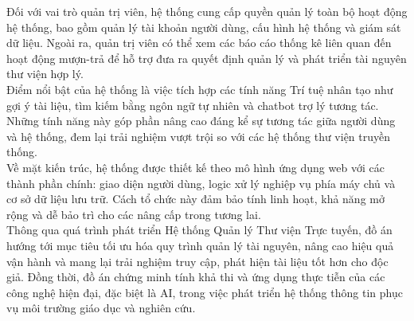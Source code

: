 Đối với vai trò quản trị viên, hệ thống cung cấp quyền quản lý toàn bộ hoạt động hệ thống, bao gồm quản lý tài khoản người dùng, cấu hình hệ thống và giám sát dữ liệu. Ngoài ra, quản trị viên có thể xem các báo cáo thống kê liên quan đến hoạt động mượn-trả để hỗ trợ đưa ra quyết định quản lý và phát triển tài nguyên thư viện hợp lý.\\

Điểm nổi bật của hệ thống là việc tích hợp các tính năng Trí tuệ nhân tạo như gợi ý tài liệu, tìm kiếm bằng ngôn ngữ tự nhiên và chatbot trợ lý tương tác. Những tính năng này góp phần nâng cao đáng kể sự tương tác giữa người dùng và hệ thống, đem lại trải nghiệm vượt trội so với các hệ thống thư viện truyền thống.\\

Về mặt kiến trúc, hệ thống được thiết kế theo mô hình ứng dụng web với các thành phần chính: giao diện người dùng, logic xử lý nghiệp vụ phía máy chủ và cơ sở dữ liệu lưu trữ. Cách tổ chức này đảm bảo tính linh hoạt, khả năng mở rộng và dễ bảo trì cho các nâng cấp trong tương lai.\\

Thông qua quá trình phát triển Hệ thống Quản lý Thư viện Trực tuyến, đồ án hướng tới mục tiêu tối ưu hóa quy trình quản lý tài nguyên, nâng cao hiệu quả vận hành và mang lại trải nghiệm truy cập, phát hiện tài liệu tốt hơn cho độc giả. Đồng thời, đồ án chứng minh tính khả thi và ứng dụng thực tiễn của các công nghệ hiện đại, đặc biệt là AI, trong việc phát triển hệ thống thông tin phục vụ môi trường giáo dục và nghiên cứu.\\

\clearpage
{}

